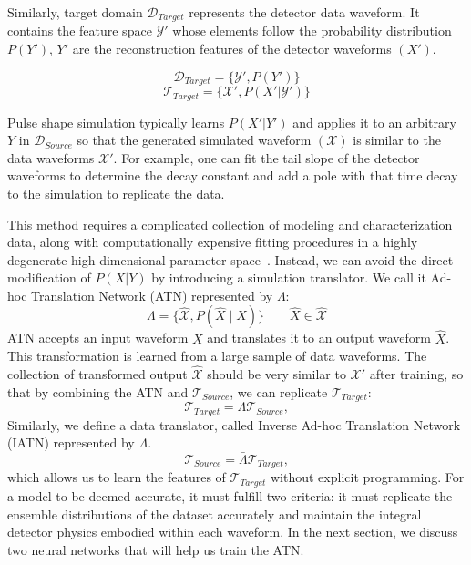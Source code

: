 Similarly, target domain $\mathcal{D}_{Target}$ represents the detector data waveform. It contains the feature space $\mathcal{Y'}$ whose elements follow the probability distribution $P(Y')$, $Y'$ are the reconstruction features of the detector waveforms $(X')$.

\begin{equation}
\mathcal{D}_{Target}=\{\mathcal{Y}',P(Y')\}
\end{equation}
\begin{equation}
\mathcal{T}_{Target}=\{\mathcal{X}',P(X'|\mathcal{Y}')\}
\end{equation}

Pulse shape simulation typically learns $P(X'|Y')$ and applies it to an arbitrary $Y$ in $\mathcal{D}_{Source}$ so that the generated simulated waveform $(\mathcal{X})$ is similar to the data waveforms $\mathcal{X}'$. For example, one can fit the tail slope of the detector waveforms to determine the decay constant and add a pole with that time decay to the simulation to replicate the data. 

This method requires a complicated collection of modeling and characterization data, along with computationally expensive fitting procedures in a highly degenerate high-dimensional parameter space~\cite{Ben_Thesis,Sam_Thesis}. Instead, we can avoid the direct modification of $P(X|Y)$ by introducing a simulation translator. We call it Ad-hoc Translation Network (ATN) represented by $\Lambda$:
\begin{equation}
\Lambda = \{\hat{\mathcal{X}}, P(\hat{X}\mid X)\}\qquad \hat{X}\in \hat{\mathcal{X}}
\label{eqn:ATN}
\end{equation}
ATN accepts an input waveform $X$ and translates it to an output waveform $\hat{X}$. This transformation is learned from a large sample of data waveforms. The collection of transformed output $\hat{\mathcal{X}}$ should be very similar to $\mathcal{X}'$ after training, so that by combining the ATN and $\mathcal{T}_{Source}$, we can replicate $\mathcal{T}_{Target}$:
\begin{equation}
    \mathcal{T}_{Target}=\Lambda \mathcal{T}_{Source} ,
    \label{eqn:ATN_task}
\end{equation}
Similarly, we define a data translator, called Inverse Ad-hoc Translation Network (IATN) represented by $\bar{\Lambda}$.
\begin{equation}
    \mathcal{T}_{Source}= \bar{\Lambda} \mathcal{T}_{Target} ,
    \label{eqn:IATN_task}
\end{equation}
which allows us to learn the features of $\mathcal{T}_{Target}$ without explicit programming. For a model to be deemed accurate, it must fulfill two criteria: it must replicate the ensemble distributions of the dataset accurately and maintain the integral detector physics embodied within each waveform. In the next section, we discuss two neural networks that will help us train the ATN.

